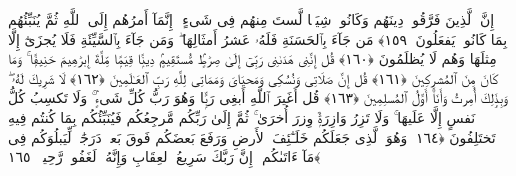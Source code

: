  إِنَّ ٱلَّذِينَ فَرَّقُوا۟ دِينَهُم وَكَانُوا۟ شِيَعًۭا لَّستَ مِنهُم فِى شَىءٍ ۚ إِنَّمَآ أَمرُهُم إِلَى ٱللَّهِ ثُمَّ يُنَبِّئُهُم بِمَا كَانُوا۟ يَفعَلُونَ ﴿١٥٩﴾
 مَن جَآءَ بِٱلحَسَنَةِ فَلَهُۥ عَشرُ أَمثَالِهَا ۖ وَمَن جَآءَ بِٱلسَّيِّئَةِ فَلَا يُجزَىٰٓ إِلَّا مِثلَهَا وَهُم لَا يُظلَمُونَ ﴿١٦٠﴾
 قُل إِنَّنِى هَدَىٰنِى رَبِّىٓ إِلَىٰ صِرَٰطٍۢ مُّستَقِيمٍۢ دِينًۭا قِيَمًۭا مِّلَّةَ إِبرَٰهِيمَ حَنِيفًۭا ۚ وَمَا كَانَ مِنَ ٱلمُشرِكِينَ ﴿١٦١﴾
 قُل إِنَّ صَلَاتِى وَنُسُكِى وَمَحيَاىَ وَمَمَاتِى لِلَّهِ رَبِّ ٱلعَـٰلَمِينَ ﴿١٦٢﴾
 لَا شَرِيكَ لَهُۥ ۖ وَبِذَٟلِكَ أُمِرتُ وَأَنَا۠ أَوَّلُ ٱلمُسلِمِينَ ﴿١٦٣﴾
 قُل أَغَيرَ ٱللَّهِ أَبغِى رَبًّۭا وَهُوَ رَبُّ كُلِّ شَىءٍۢ ۚ وَلَا تَكسِبُ كُلُّ نَفسٍ إِلَّا عَلَيهَا ۚ وَلَا تَزِرُ وَازِرَةٌۭ وِزرَ أُخرَىٰ ۚ ثُمَّ إِلَىٰ رَبِّكُم مَّرجِعُكُم فَيُنَبِّئُكُم بِمَا كُنتُم فِيهِ تَختَلِفُونَ ﴿١٦٤﴾
 وَهُوَ ٱلَّذِى جَعَلَكُم خَلَـٰٓئِفَ ٱلأَرضِ وَرَفَعَ بَعضَكُم فَوقَ بَعضٍۢ دَرَجَٰتٍۢ لِّيَبلُوَكُم فِى مَآ ءَاتَىٰكُم ۗ إِنَّ رَبَّكَ سَرِيعُ ٱلعِقَابِ وَإِنَّهُۥ لَغَفُورٌۭ رَّحِيمٌۢ ﴿١٦٥﴾
 
